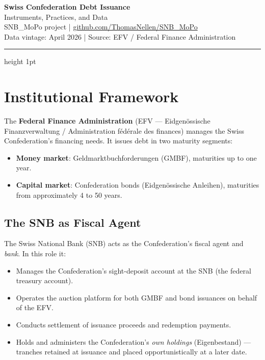 \documentclass[12pt,a4paper]{article}
\begin{document}

\begin{center}
  {\LARGE\bfseries Swiss Confederation Debt Issuance}\\[0.4em]
  {\large Instruments, Practices, and Data}\\[1.2em]
  {\normalsize SNB\_MoPo project \quad|\quad
   \href{https://github.com/ThomasNellen/SNB_MoPo}{github.com/ThomasNellen/SNB\_MoPo}}\\[0.3em]
  {\small\textcolor{midgray}{Data vintage: April 2026 \quad|\quad
   Source: EFV / Federal Finance Administration}}
\end{center}

\vspace{0.5em}
\hrule height 1pt
\vspace{1.5em}

\section{Institutional Framework}

The \textbf{Federal Finance Administration} (EFV --- Eidgenössische Finanz\-verwaltung
/ Administration fédérale des finances) manages the Swiss Confederation's
financing needs.  It issues debt in two maturity segments:

\begin{itemize}[leftmargin=1.5em, itemsep=2pt]
  \item \textbf{Money market}: Geldmarktbuchforderungen (GMBF), maturities up
    to one year.
  \item \textbf{Capital market}: Confederation bonds (Eidgenössische Anleihen),
    maturities from approximately 4 to 50 years.
\end{itemize}

\subsection{The SNB as Fiscal Agent}

The Swiss National Bank (SNB) acts as the Confederation's fiscal agent and
\emph{bank}.  In this role it:

\begin{itemize}[leftmargin=1.5em, itemsep=2pt]
  \item Manages the Confederation's sight-deposit account at the SNB (the
    federal treasury account).
  \item Operates the auction platform for both GMBF and bond issuances on
    behalf of the EFV.
  \item Conducts settlement of issuance proceeds and redemption payments.
  \item Holds and administers the Confederation's \emph{own holdings}
    (Eigenbestand) --- tranches retained at issuance and placed opportunistically
    at a later date.
\end{itemize}
\end{document}
